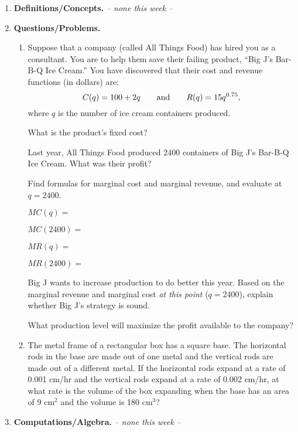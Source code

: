 \documentclass[11pt,letterpaper]{article}
\begin{document}
\begin{enumerate}
\item \textbf{Definitions/Concepts.} \emph{-- none this week --}

\vspace{1pc}
\item \textbf{Questions/Problems.}  

\begin{enumerate}
\item Suppose that a company (called All
Things Food) has hired you as a consultant. You are to
help them
save their failing product, ``Big J's Bar-B-Q Ice
Cream.'' You
have discovered that their cost and revenue functions
(in dollars)
are:
$$C(q)= 100 + 2q \qquad{\rm and}\qquad
R(q)= 15 q^{0.75},$$ where $q$ is the
number of ice cream containers produced. 

\vspace{0.3in}
 What is the product's fixed cost?

\vspace{1.0in}
 Last year, All Things Food produced
$2400$ containers of Big J's Bar-B-Q Ice Cream. What
was their
profit?

\vspace{1.5in}
 Find formulas for marginal cost and
marginal revenue, and evaluate at
$q=2400$.

\vspace{.4in}
$MC(q) = $

\vspace{0.4in}
$MC(2400) =$

\vspace{0.4in}
$MR(q) = $

\vspace{0.4in}
$MR(2400) =$

\vspace{0.4in}
 Big J wants to increase production
to
do better this year. Based on the marginal revenue and
marginal
cost {\it at this point} ($q=2400$), explain whether
Big J's
strategy is sound. 

\vspace{2.0in}
 What production level will maximize
the profit available to the company?

\vspace{2.0in}
\item The metal frame of a rectangular box has a square base.  The horizontal rods in the base are made out of one metal and the vertical rods are made out of a different metal.  If the horizontal rods expand at a rate of 0.001 cm/hr and the vertical rods expand at a rate of 0.002 cm/hr, at what rate is the volume of the box expanding when the base has an area of 9 cm$^2$ and the volume is 180 cm$^3$?

\end{enumerate}

\vfill
\item \textbf{Computations/Algebra.}  \emph{-- none this week --}

\end{enumerate}

\end{document}
